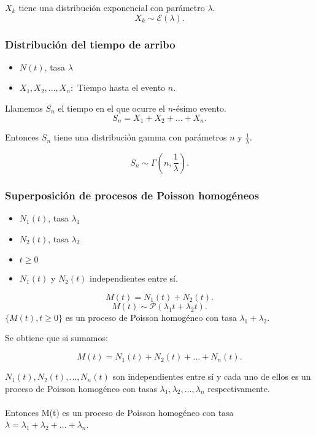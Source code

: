 \documentclass[11pt, a4paper]{article}
\theoremstyle{definition}
\begin{document}
$X_k$ tiene una distribución exponencial con parámetro $\lambda$.
\[
X_k\sim\mathcal{E}(\lambda).\]

\subsubsection{Distribución del tiempo de arribo}

\begin{itemize}
    \item $N(t)$, tasa $\lambda$
    \item $X_1, X_2, \ldots, X_n:$ Tiempo hasta el evento $n$.
\end{itemize}

Llamemos $S_n$ el tiempo en el que ocurre el $n$-ésimo evento.
\[
S_n = X_1 + X_2 + \ldots + X_n.\]

Entonces $S_n$ tiene una distribución gamma con parámetros $n$ y $\frac{1}{\lambda}$.

\[
S_n\sim\Gamma(n,\frac{1}{\lambda}).\]


\subsubsection{Superposición de procesos de Poisson homogéneos}

\begin{itemize}
    \item $N_1(t)$, tasa $\lambda_1$
    \item $N_2(t)$, tasa $\lambda_2$
    \item $t \geq 0$
    \item $N_1(t)$ y $N_2(t)$ independientes entre sí.
\end{itemize}
\[
M(t) = N_1(t) + N_2(t).\]
\[
M(t) \sim\mathcal{P}(\lambda_1 t + \lambda_2 t).\]
$\{M(t), t \geq 0 \}$ es un proceso de Poisson homogéneo con tasa $\lambda_1 + \lambda_2$.

Se obtiene que si sumamos:

\[
M(t) = N_1(t) + N_2(t) + \ldots + N_n(t).\]

$N_1(t), N_2(t), \ldots, N_n(t)$ son independientes entre sí 
y cada uno de ellos es un proceso de Poisson homogéneo con tasas $\lambda_1, \lambda_2, \ldots, \lambda_n$ respectivamente.
\\ \\
Entonces M(t) es un proceso de Poisson homogéneo con tasa $\lambda = \lambda_1 + \lambda_2 + \ldots + \lambda_n$.
\\ \\
\end{document}
